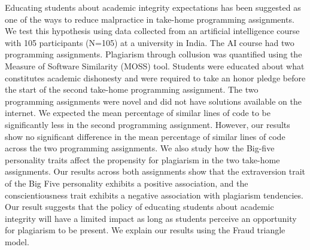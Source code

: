 
Educating students about academic integrity expectations has been suggested as one of the ways to reduce malpractice in take-home programming assignments. We test this hypothesis using data collected from an artificial intelligence course with 105 participants (N=105) at a university in India. The AI course had two programming assignments. Plagiarism through collusion was quantified using the Measure of Software Similarity (MOSS) tool. Students were educated about what constitutes academic dishonesty and were required to take an honor pledge before the start of the second take-home programming assignment. The two programming assignments were novel and did not have solutions available on the internet. We expected the mean percentage of similar lines of code to be significantly less in the second programming assignment. However, our results show no significant difference in the mean percentage of similar lines of code across the two programming assignments. We also study how the Big-five personality traits affect the propensity for plagiarism in the two take-home assignments. Our results across both assignments show that the extraversion trait of the Big Five personality exhibits a positive association, and the conscientiousness trait exhibits a negative association with plagiarism tendencies. 
Our result suggests that the policy of educating students about academic integrity will have a limited impact as long as students perceive an opportunity for plagiarism to be present. We explain our results using the Fraud triangle model.


